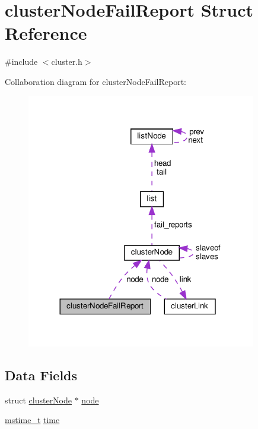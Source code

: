 \hypertarget{structcluster_node_fail_report}{}\section{cluster\+Node\+Fail\+Report Struct Reference}
\label{structcluster_node_fail_report}


{\ttfamily \#include $<$cluster.\+h$>$}



Collaboration diagram for cluster\+Node\+Fail\+Report\+:
\nopagebreak
\begin{figure}[H]
\begin{center}
\leavevmode
\includegraphics[width=284pt]{structcluster_node_fail_report__coll__graph}
\end{center}
\end{figure}
\subsection*{Data Fields}
\begin{DoxyCompactItemize}
\item 
struct \hyperlink{structcluster_node}{cluster\+Node} $\ast$ \hyperlink{structcluster_node_fail_report_a7aa2bc440db9dc659120a310878cac0f}{node}
\item 
\hyperlink{redismodule_8h_a652ae61e2475bc8957454534544968fc}{mstime\+\_\+t} \hyperlink{structcluster_node_fail_report_a1f28210ccf56a01319b20295b8ff190e}{time}
\end{DoxyCompactItemize}


